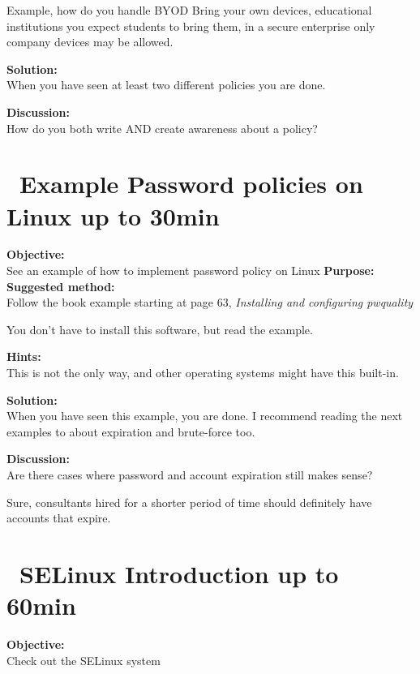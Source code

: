 \documentclass[a4paper,11pt,notitlepage]{report}
\begin{document}
Example, how do you handle BYOD Bring your own devices, educational institutions you expect students to bring them, in a secure enterprise only company devices may be allowed.

{\bf Solution:}\\
When you have seen at least two different policies you are done.

{\bf Discussion:}\\
How do you both write AND create awareness about a policy?




\chapter{\faExclamationTriangle\ Example Password policies on Linux up to 30min}
\label{ex:mlsh-pwquality}

{\bf Objective:}\\
See an example of how to implement password policy on Linux
{\bf Purpose:}\\

{\bf Suggested method:}\\
Follow the book example starting at page 63, \emph{Installing and configuring pwquality}

You don't have to install this software, but read the example.

{\bf Hints:}\\
This is not the only way, and other operating systems might have this built-in.


{\bf Solution:}\\
When you have seen this example, you are done. I recommend reading the next examples to about expiration and brute-force too.

{\bf Discussion:}\\
Are there cases where password and account expiration still makes sense?

Sure, consultants hired for a shorter period of time should definitely have accounts that expire.

\chapter{\faInfoCircle\ SELinux Introduction up to 60min}
\label{ex:se-linux-intro}



{\bf Objective:}\\
Check out the SELinux system\\
\end{document}
